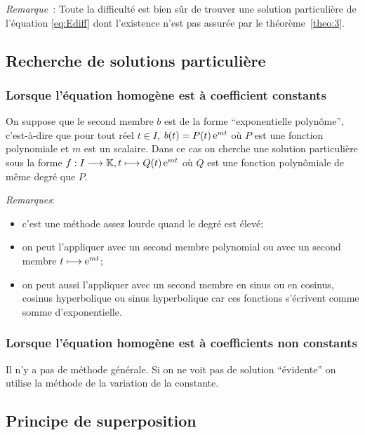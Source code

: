 \emph{Remarque}~: Toute la difficulté est bien sûr de trouver une solution
particulière de l'équation \eqref{eq:Ediff} dont l'existence n'est pas assurée
par le théorème~\ref{theo:3}.

\subsection{Recherche de solutions particulière}
\label{subsec:recherchesolutionpart}

\subsubsection{Lorsque l'équation homogène est à coefficient constants}
\label{subsubsec:recherchesolutionpart-coefconstants}

On suppose que le second membre \(b\) est de la forme ``exponentielle
polynôme'', c'est-à-dire que pour tout réel \(t \in I\), \(b(t) = P(t) \operatorname{e}^{mt}\)
où \(P\) est une fonction polynomiale et \(m\) est un scalaire. Dans ce cas on
cherche une solution particulière sous la forme
\(f:I \longrightarrow{} \mathbb{K}, t \longmapsto{} Q(t)\operatorname{e}^{mt}\) où \(Q\) est une fonction polynômiale
de même degré que \(P\).

\emph{Remarques}:
\begin{itemize}
  \item c'est une méthode assez lourde quand le degré est élevé;
  \item on peut l'appliquer avec un second membre polynomial ou avec un second
    membre \(t \longmapsto \operatorname{e}^{mt}\);
  \item on peut aussi l'appliquer avec un second membre en sinus ou en
    cosinus, cosinus hyperbolique ou sinus hyperbolique car ces fonctions
    s'écrivent comme somme d'exponentielle.
\end{itemize}

\subsubsection{Lorsque l'équation homogène est à coefficients non constants}
\label{subsubsec:recherchesolutionpart-coefnnconstants}

Il n'y a pas de méthode générale. Si on ne voit pas de solution ``évidente'' on
utilise la méthode de la variation de la constante.

\subsection{Principe de superposition}
\label{subsec:principesuperposition}

